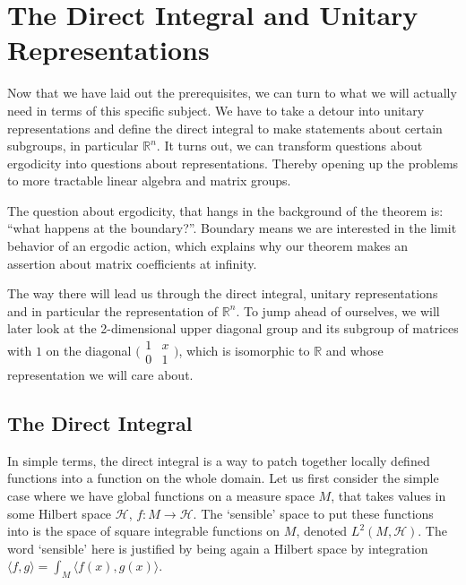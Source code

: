 \documentclass[
  12pt
]{article}
\numberwithin{equation}{section}
\theoremstyle{plain}
\newcommand{\bbr}{\ensuremath{\mathbb{R}}\xspace}
\newcommand{\ipmatrix}[1]{%
\ensuremath{\big(\begin{smallmatrix} #1 \end{smallmatrix}\big)}\xspace}
\begin{document}


\hypertarget{the-direct-integral-and-unitary-representations}{%
\section{The Direct Integral and Unitary Representations}\label{the-direct-integral-and-unitary-representations}}


  Now that we have laid out the prerequisites, we can turn to what we will actually need in terms of this specific subject.
  We have to take a detour into unitary
  representations and define the direct integral to make statements about
  certain subgroups, in particular $\bbr^n$.
  It turns out, we can transform questions about ergodicity into questions about representations.
  Thereby opening up the problems to more tractable linear algebra and matrix groups.

  The question about ergodicity, that hangs in the background of the theorem is:
  ``what happens at the boundary?''. Boundary means we are interested in the limit behavior of an ergodic action, which explains why our theorem makes an assertion about matrix coefficients at infinity.

  The way there will lead us through the direct integral, unitary
  representations and in particular the representation of $\mathbb{R}^n$. To
  jump ahead of ourselves, we will later look at the 2-dimensional upper
  diagonal group and its subgroup of matrices with $1$ on the diagonal
  \ipmatrix{1 & x \\ 0 & 1}, which is isomorphic to $\mathbb{R}$ and whose
  representation we will care about.

  \hypertarget{the-direct-integral}{%
  \subsection{The Direct Integral}\label{the-direct-integral}}

  In simple terms, the direct integral is a way to patch together locally
  defined functions into a function on the whole domain. Let us first
  consider the simple case where we have global functions on a measure
  space $M$, that takes values in some Hilbert space $\mathscr{H}$,
  $f:M \rightarrow \mathscr{H}$. The `sensible' space to put these
  functions into is the space of square integrable functions on $M$,
  denoted $L^2(M, \mathscr{H})$. The word `sensible' here is justified
  by being again a Hilbert space by integration
  $\langle f, g\rangle = \int_M\langle f(x), g(x)\rangle$.
\end{document}
